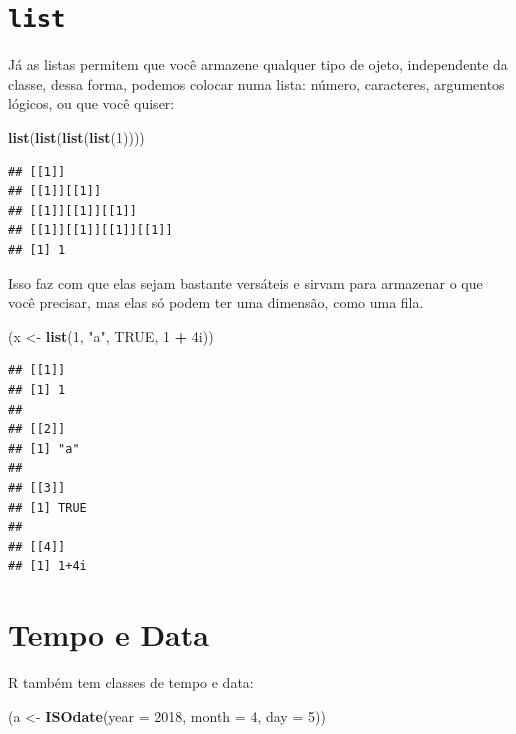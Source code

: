 \documentclass[]{book}
\newenvironment{Shaded}{\begin{snugshade}}{\end{snugshade}}
\newcommand{\KeywordTok}[1]{\textcolor[rgb]{0.13,0.29,0.53}{\textbf{#1}}}
\newcommand{\DataTypeTok}[1]{\textcolor[rgb]{0.13,0.29,0.53}{#1}}
\newcommand{\DecValTok}[1]{\textcolor[rgb]{0.00,0.00,0.81}{#1}}
\newcommand{\StringTok}[1]{\textcolor[rgb]{0.31,0.60,0.02}{#1}}
\newcommand{\OtherTok}[1]{\textcolor[rgb]{0.56,0.35,0.01}{#1}}
\newcommand{\OperatorTok}[1]{\textcolor[rgb]{0.81,0.36,0.00}{\textbf{#1}}}
\newcommand{\NormalTok}[1]{#1}
\theoremstyle{definition}
\theoremstyle{definition}
\theoremstyle{definition}
\theoremstyle{remark}
\begin{document}
\section{\texorpdfstring{\texttt{list}}{list}}\label{list}

Já as listas permitem que você armazene qualquer tipo de ojeto,
independente da classe, dessa forma, podemos colocar numa lista: número,
caracteres, argumentos lógicos, ou que você quiser:

\begin{Shaded}
\begin{Highlighting}[]
\KeywordTok{list}\NormalTok{(}\KeywordTok{list}\NormalTok{(}\KeywordTok{list}\NormalTok{(}\KeywordTok{list}\NormalTok{(}\DecValTok{1}\NormalTok{))))}
\end{Highlighting}
\end{Shaded}

\begin{verbatim}
## [[1]]
## [[1]][[1]]
## [[1]][[1]][[1]]
## [[1]][[1]][[1]][[1]]
## [1] 1
\end{verbatim}

Isso faz com que elas sejam bastante versáteis e sirvam para armazenar o
que você precisar, mas elas só podem ter uma dimensão, como uma fila.

\begin{Shaded}
\begin{Highlighting}[]
\NormalTok{(x <-}\StringTok{ }\KeywordTok{list}\NormalTok{(}\DecValTok{1}\NormalTok{, }\StringTok{"a"}\NormalTok{, }\OtherTok{TRUE}\NormalTok{, }\DecValTok{1} \OperatorTok{+}\StringTok{ }\NormalTok{4i))}
\end{Highlighting}
\end{Shaded}

\begin{verbatim}
## [[1]]
## [1] 1
## 
## [[2]]
## [1] "a"
## 
## [[3]]
## [1] TRUE
## 
## [[4]]
## [1] 1+4i
\end{verbatim}

\section{Tempo e Data}\label{tempo-e-data}

R também tem classes de tempo e data:

\begin{Shaded}
\begin{Highlighting}[]
\NormalTok{(a <-}\StringTok{ }\KeywordTok{ISOdate}\NormalTok{(}\DataTypeTok{year =} \DecValTok{2018}\NormalTok{, }\DataTypeTok{month =} \DecValTok{4}\NormalTok{, }\DataTypeTok{day =} \DecValTok{5}\NormalTok{))}
\end{Highlighting}
\end{Shaded}
\end{document}
